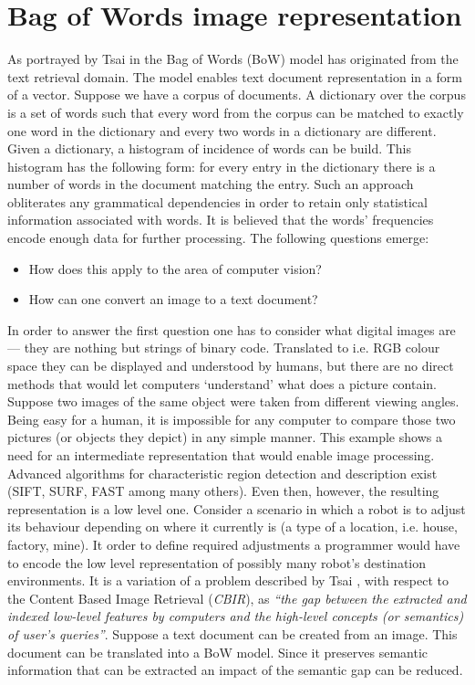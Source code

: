 \section{Bag of Words image representation}

  As portrayed by Tsai in \cite{tsai2012bag} the Bag of Words (BoW) model has originated from the text retrieval domain. The model enables text document representation in a form of a vector. Suppose we have a corpus of documents. A dictionary over the corpus is a set of words such that every word from the corpus can be matched to exactly one word in the dictionary and every two words in a dictionary are different. Given a dictionary, a histogram of incidence of words can be build. This histogram has the following form: for every entry in the dictionary there is a number of words in the document matching the entry. Such an approach obliterates any grammatical dependencies in order to retain only statistical information associated with words. It is believed that the words' frequencies encode enough data for further processing. The following questions emerge: 
  
  \begin{itemize}
    \item How does this apply to the area of computer vision?
    \item How can one convert an image to a text document? 
  \end{itemize}
  
  In order to answer the first question one has to consider what digital images are --- they are nothing but strings of binary code. Translated to i.e. RGB colour space they can be displayed and understood by humans, but there are no direct methods that would let computers `understand' what does a picture contain. Suppose two images of the same object were taken from different viewing angles. Being easy for a human,  it is impossible for any computer to compare those two pictures (or objects they depict) in any simple manner. This example shows a need for an intermediate representation that would enable image processing. Advanced algorithms for characteristic region detection and description exist (SIFT, SURF, FAST among many others). Even then, however, the resulting representation is a low level one. Consider a scenario in which a robot is to adjust its behaviour depending on where it currently is (a type of a location, i.e. house, factory, mine). It order to define required adjustments a programmer would have to encode the low level representation of possibly many robot's destination environments. It is a variation of a problem described by Tsai \cite{tsai2012bag}, with respect to the Content Based Image Retrieval (\textit{CBIR}), as \emph{``the gap between the extracted and indexed low-level features by computers and the high-level concepts (or semantics) of user’s queries''}. Suppose a text document can be created from an image. This document can be translated into a BoW model. Since it preserves semantic information that can be extracted an impact of the semantic gap can be reduced.
  
